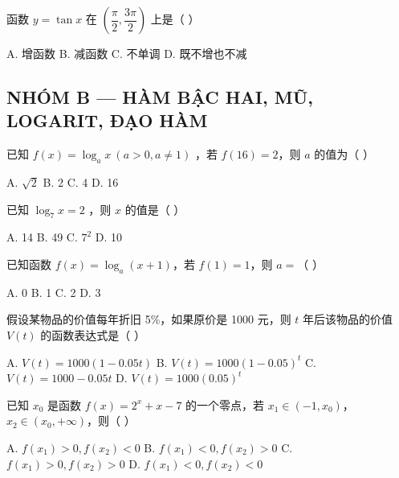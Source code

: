 \documentclass[11pt, a4paper]{article}
\begin{document}
\begin{baitap}[13]
函数 $y = \tan x$ 在 $\left(\dfrac{\pi}{2}, \dfrac{3\pi}{2}\right)$ 上是（ ）
\par\vspace{3pt}
\noindent A. 增函数 \quad B. 减函数 \quad C. 不单调 \quad D. 既不增也不减
\end{baitap}

\subsection*{NHÓM B — HÀM BẬC HAI, MŨ, LOGARIT, ĐẠO HÀM}

\begin{baitap}[14]
已知 $f(x) = \log_a x\ (a > 0, a \ne 1)$ ，若 $f(16) = 2$，则 $a$ 的值为（ ）
\par\vspace{3pt}
\noindent A. $\sqrt{2}$ \quad B. 2 \quad C. 4 \quad D. 16
\end{baitap}

\begin{baitap}[15]
已知 $\log_{7}x = 2$ ，则 $x$ 的值是（ ）
\par\vspace{3pt}
\noindent A. 14 \quad B. 49 \quad C. $7^2$ \quad D. 10
\end{baitap}

\begin{baitap}[16]
已知函数 $f(x) = \log_a(x+1)$，若 $f(1)=1$，则 $a =$（ ）
\par\vspace{3pt}
\noindent A. 0 \quad B. 1 \quad C. 2 \quad D. 3
\end{baitap}

\begin{baitap}[17]
假设某物品的价值每年折旧 5\%，如果原价是 1000 元，则 $t$ 年后该物品的价值 $V(t)$ 的函数表达式是（ ）
\par\vspace{3pt}
\noindent A. $V(t) = 1000(1 - 0.05t)$ \quad B. $V(t) = 1000(1 - 0.05)^t$ \quad C. $V(t) = 1000 - 0.05t$ \quad D. $V(t) = 1000(0.05)^t$
\end{baitap}

\begin{baitap}[18]
已知 $x_0$ 是函数 $f(x) = 2^x + x - 7$ 的一个零点，若 $x_1 \in (-1, x_0)$，$x_2 \in (x_0, +\infty)$，则（ ）
\par\vspace{3pt}
\noindent A. $f(x_1) > 0, f(x_2) < 0$ \quad B. $f(x_1) < 0, f(x_2) > 0$ \quad C. $f(x_1) > 0, f(x_2) > 0$ \quad D. $f(x_1) < 0, f(x_2) < 0$
\end{baitap}
\end{document}
